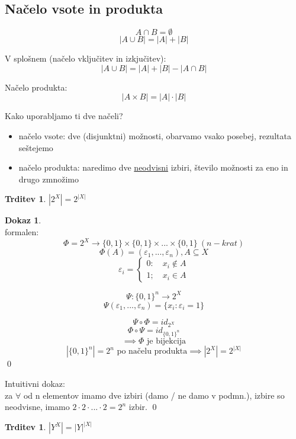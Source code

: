 \documentclass[a4paper,12pt]{article}
\theoremstyle{definition}
\newtheorem{claim}[counter]{Trditev}
\newtheorem{pro}[counter]{Dokaz}
\theoremstyle{remark}
\begin{document}
\subsection{Načelo vsote in produkta}

\[
A \cap B = \emptyset
\]
\[
|A \cup B| = |A| + |B|
\]

V splošnem (načelo vključitev in izkjučitev):
\[
|A \cup B| = |A| + |B| - |A \cap B|
\]


Načelo produkta:
\[
|A\times B| = |A|\cdot|B|
\]

Kako uporabljamo ti dve načeli?
\begin{itemize}
\item načelo vsote: dve (disjunktni) možnosti, obarvamo vsako posebej, rezultata seštejemo
\item načelo produkta: naredimo dve \underline{neodvisni} izbiri, število možnosti za eno in drugo zmnožimo
\end{itemize}

\begin{claim}
$|2^X| = 2^{|X|}$
\end{claim}


\begin{pro}
 \ \\formalen:\\
\[\Phi = 2^X \rightarrow \{0, 1\}\times\{0, 1\}\times...\times\{0, 1\} \ (n-krat)\]
\[\Phi(A) = (\varepsilon_1, ..., \varepsilon_n), A \subseteq X\]
\[\varepsilon_i = \begin{cases}0: \quad x_i \notin A  \\ 1; \quad x_i \in A \end{cases}\]


\[
\Psi : \{0, 1\}^n \rightarrow 2^X
\]
\[
\Psi (\varepsilon_1, ..., \varepsilon_n) = \{x_i : \varepsilon_i = 1\}
\]


\[\Psi \circ \Phi = id_{2^X}\]
\[\Phi \circ \Psi = id_{\{0, 1\}^n}\]
\[\implies \Phi \text{ je bijekcija}\]
\[|\{0, 1\}^n| = 2^n \text{ po načelu produkta}\implies |2^X| = 2^{|X|}\]
\qed

Intuitivni dokaz:\\
za $\forall$ od n elementov imamo dve izbiri (damo / ne damo v podmn.), izbire so neodvisne, imamo
$2 \cdot 2 \cdot ...\cdot 2 = 2^n$
izbir.
\qed
\end{pro}

\begin{claim}
$|Y^X| = |Y|^{|X|}$
\end{claim}
\end{document}
